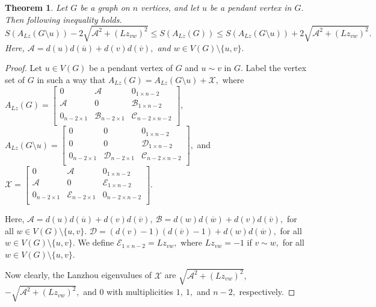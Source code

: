 \documentclass[10pt,a4paper,oneside]{article}
\newtheorem{theorem}{Theorem}
\begin{document}
\begin{theorem}
Let $G$ be a graph on $n$ vertices, and let $u$ be a pendant vertex in $G.$ Then following inequality holds.
$$S(A_{Lz}(G\setminus u))-2\sqrt{\mathcal{A}^2+(Lz_{vw})^2}\leq S(A_{Lz}(G))\leq S(A_{Lz}(G\setminus u))+2\sqrt{\mathcal{A}^2+(Lz_{vw})^2}.$$
Here, $\mathcal{A}=d(u)d(\overline{u})+d(v)d(\overline{v}),$ and $w\in V(G)\setminus \{u,v\}.$
\end{theorem}
\begin{proof}
Let $u\in V(G)$ be a pendant vertex of $G$ and $u\sim v$ in $G.$ Label the vertex set of $G$ in such a way that $A_{Lz}(G)=A_{Lz}(G\setminus u)+\mathcal{X},$ where 
\small
$A_{Lz}(G)=\begin{bmatrix}
0 & \mathcal{A} &0_{1\times n-2} \\
\mathcal{A} & 0 & \mathcal{B}_{1 \times n-2}\\
0_{n-2\times 1} & \mathcal{B}_{n-2\times 1} & \mathcal{C}_{n-2\times n-2}\\
\end{bmatrix},$  $A_{Lz}(G\setminus u)=\begin{bmatrix}
0 & 0 &0_{1\times n-2} \\
0 & 0 & \mathcal{D}_{1 \times n-2}\\
0_{n-2\times 1} & \mathcal{D}_{n-2\times 1} & \mathcal{C}_{n-2\times n-2}\\
\end{bmatrix},$ and  $\mathcal{X}=\begin{bmatrix}
0 & \mathcal{A} &0_{1\times n-2} \\
\mathcal{A} & 0 & \mathcal{E}_{1 \times n-2}\\
0_{n-2\times 1} & \mathcal{E}_{n-2\times 1} & 0_{n-2\times n-2}\\
\end{bmatrix}.$ 
	
	\normalsize
	
	\vspace{0.5cm}
	
	
	Here, $\mathcal{A}=d(u)d(\overline{u})+d(v)d(\overline{v}),\ \mathcal{B}=d(w)d(\overline{w})+d(v)d(\overline{v}),$ for all $w\in V(G)\setminus \{u,v\}.$  $\mathcal{D}=(d(v)-1)(d(\overline{v})-1)+d(w)d(\overline{w}),$ for all $w\in V(G)\setminus \{u,v\}.$ 	
	 We define $\mathcal{E}_{1\times n-2}=Lz_{vw},$ where $Lz_{vw}=-1$ if $v\sim w,$ for all $w\in V(G)\setminus \{u,v\}.$ 
	
	Now clearly, the Lanzhou eigenvalues of $\mathcal{X}$ are $\sqrt{\mathcal{A}^2+(Lz_{vw})^2},$ $-\sqrt{\mathcal{A}^2+(Lz_{vw})^2},$ and $0$ with multiplicities $1,\ 1,$ and $n-2,$ respectively.
	

\end{proof}
\end{document}
